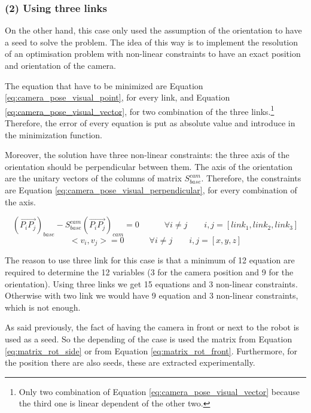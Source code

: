 \documentclass[12pt,a4paper,final,twoside,openright]{report}
\begin{document}
\subsubsection{(2) Using three links}

On the other hand, this case only used the assumption of the orientation to have a seed to solve the problem. The idea of this way is to implement the resolution of an optimisation problem with non-linear constraints to have an exact position and orientation of the camera.

The equation that have to be minimized are Equation \eqref{eq:camera_pose_visual_point}, for every link, and Equation 
\eqref{eq:camera_pose_visual_vector}, for two combination of the three links.\footnote{Only two combination of Equation \eqref{eq:camera_pose_visual_vector} because the third one is linear dependent of the other two.} Therefore, the error of every equation is put as absolute value and introduce in the minimization function. 

Moreover, the solution have three non-linear constraints: the three axis of the orientation should be perpendicular between them. The axis of the orientation are the unitary vectors of the columns of matrix $S_{base}^{cam}$. Therefore, the constraints are Equation \eqref{eq:camera_pose_visual_perpendicular}, for every combination of the axis. 

\begin{equation}\label{eq:camera_pose_visual_vector}
\left( \overrightarrow{P_iP_j} \right)_{base} - S_{base}^{cam} \left( \overrightarrow{P_iP_j} \right)_{cam} = 0  \quad \quad \quad \forall i \neq j \quad \quad i,j=\left[ link_1,link_2,link_3 \right]
\end{equation}
\begin{equation}\label{eq:camera_pose_visual_perpendicular}
<v_i , v_j > = 0 \quad \quad \quad \forall i \neq j \quad \quad i,j=\left[x,y,z\right]
\end{equation}

The reason to use three link for this case is that a minimum of 12 equation are required to determine the 12 variables (3 for the camera position and 9 for the orientation). Using three links we get 15 equations and 3 non-linear constraints. Otherwise with two link we would have 9 equation and 3 non-linear constraints, which is not enough.

As said previously, the fact of having the camera in front or next to the robot is used as a seed. So the depending of the case is used the matrix from Equation \eqref{eq:matrix_rot_side} or from Equation \eqref{eq:matrix_rot_front}. Furthermore, for the position there are also seeds, these are extracted experimentally.
\end{document}
